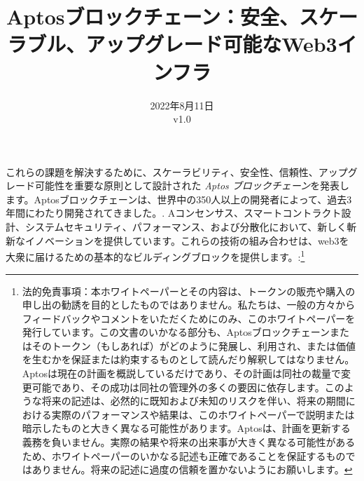 \documentclass{article}
\title{Aptosブロックチェーン：安全、スケーラブル、アップグレード可能なWeb3インフラ}
\author{}
\date{2022年8月11日\\v1.0}
\begin{document}
\maketitle

\renewcommand{\abstractname}{要約}
\renewcommand{\figurename}{絵}

これらの課題を解決するために、スケーラビリティ、安全性、信頼性、アップグレード可能性を重要な原則として設計された \emph{Aptos ブロックチェーン}を発表します。Aptosブロックチェーンは、世界中の350人以上の開発者によって、過去3年間にわたり開発されてきました。\cite{aptos_core_github}. Aコンセンサス、スマートコントラクト設計、システムセキュリティ、パフォーマンス、および分散化において、新しく斬新なイノベーションを提供しています。これらの技術の組み合わせは、web3を大衆に届けるための基本的なビルディングブロックを提供します。:\footnote{法的免責事項：本ホワイトペーパーとその内容は、トークンの販売や購入の申し出の勧誘を目的としたものではありません。私たちは、一般の方々からフィードバックやコメントをいただくためにのみ、このホワイトペーパーを発行しています。この文書のいかなる部分も、Aptosブロックチェーンまたはそのトークン（もしあれば）がどのように発展し、利用され、または価値を生むかを保証または約束するものとして読んだり解釈してはなりません。Aptosは現在の計画を概説しているだけであり、その計画は同社の裁量で変更可能であり、その成功は同社の管理外の多くの要因に依存します。このような将来の記述は、必然的に既知および未知のリスクを伴い、将来の期間における実際のパフォーマンスや結果は、このホワイトペーパーで説明または暗示したものと大きく異なる可能性があります。Aptosは、計画を更新する義務を負いません。実際の結果や将来の出来事が大きく異なる可能性があるため、ホワイトペーパーのいかなる記述も正確であることを保証するものではありません。将来の記述に過度の信頼を置かないようにお願いします。}
 
\end{document}
